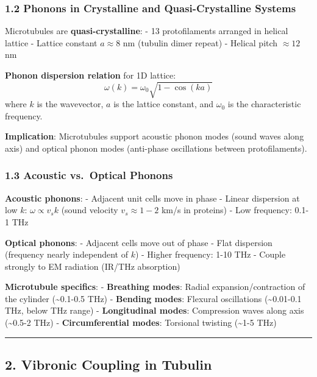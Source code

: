 \subsubsection{1.2 Phonons in Crystalline and Quasi-Crystalline
Systems}\label{phonons-in-crystalline-and-quasi-crystalline-systems}

Microtubules are \textbf{quasi-crystalline}: - 13 protofilaments
arranged in helical lattice - Lattice constant \(a \approx 8\) nm
(tubulin dimer repeat) - Helical pitch \(\approx 12\) nm

\textbf{Phonon dispersion relation} for 1D lattice:
\[\omega(k) = \omega_0 \sqrt{1 - \cos(ka)}\] where \(k\) is the
wavevector, \(a\) is the lattice constant, and \(\omega_0\) is the
characteristic frequency.

\textbf{Implication}: Microtubules support acoustic phonon modes (sound
waves along axis) and optical phonon modes (anti-phase oscillations
between protofilaments).

\subsubsection{1.3 Acoustic vs.~Optical
Phonons}\label{acoustic-vs.-optical-phonons}

\textbf{Acoustic phonons}: - Adjacent unit cells move in phase - Linear
dispersion at low \(k\): \(\omega \propto v_s k\) (sound velocity
\(v_s \approx 1-2\) km/s in proteins) - Low frequency: 0.1-1 THz

\textbf{Optical phonons}: - Adjacent cells move out of phase - Flat
dispersion (frequency nearly independent of \(k\)) - Higher frequency:
1-10 THz - Couple strongly to EM radiation (IR/THz absorption)

\textbf{Microtubule specifics}: - \textbf{Breathing modes}: Radial
expansion/contraction of the cylinder (\textasciitilde0.1-0.5 THz) -
\textbf{Bending modes}: Flexural oscillations (\textasciitilde0.01-0.1
THz, below THz range) - \textbf{Longitudinal modes}: Compression waves
along axis (\textasciitilde0.5-2 THz) - \textbf{Circumferential modes}:
Torsional twisting (\textasciitilde1-5 THz)

\begin{center}\rule{0.5\linewidth}{0.5pt}\end{center}

\subsection{2. Vibronic Coupling in
Tubulin}\label{vibronic-coupling-in-tubulin}

